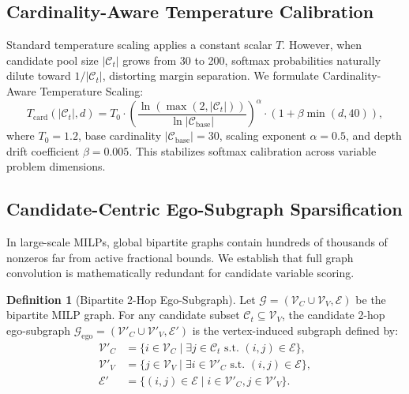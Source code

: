 \documentclass[10pt,twocolumn,letterpaper]{article}
\theoremstyle{plain}
\theoremstyle{definition}
\newtheorem{definition}{Definition}
\theoremstyle{remark}
\begin{document}
\subsection{Cardinality-Aware Temperature Calibration}
Standard temperature scaling applies a constant scalar $T$. However, when candidate pool size $|\mathcal{C}_t|$ grows from 30 to 200, softmax probabilities naturally dilute toward $1 / |\mathcal{C}_t|$, distorting margin separation. We formulate Cardinality-Aware Temperature Scaling:
\begin{equation}
    T_{\text{card}}(|\mathcal{C}_t|, d) = T_0 \cdot \left(\frac{\ln(\max(2, |\mathcal{C}_t|))}{\ln |\mathcal{C}_{\text{base}}|}\right)^\alpha \cdot \left(1 + \beta \min(d, 40)\right), \label{eq:temp_scaling}
\end{equation}
where $T_0 = 1.2$, base cardinality $|\mathcal{C}_{\text{base}}| = 30$, scaling exponent $\alpha = 0.5$, and depth drift coefficient $\beta = 0.005$. This stabilizes softmax calibration across variable problem dimensions.

\subsection{Candidate-Centric Ego-Subgraph Sparsification}
In large-scale MILPs, global bipartite graphs contain hundreds of thousands of nonzeros far from active fractional bounds. We establish that full graph convolution is mathematically redundant for candidate variable scoring.

\begin{definition}[Bipartite 2-Hop Ego-Subgraph]
Let $\mathcal{G} = (\mathcal{V}_C \cup \mathcal{V}_V, \mathcal{E})$ be the bipartite MILP graph. For any candidate subset $\mathcal{C}_t \subseteq \mathcal{V}_V$, the candidate 2-hop ego-subgraph $\mathcal{G}_{\text{ego}} = (\mathcal{V}'_C \cup \mathcal{V}'_V, \mathcal{E}')$ is the vertex-induced subgraph defined by:
\begin{align}
    \mathcal{V}'_C &= \{i \in \mathcal{V}_C \mid \exists j \in \mathcal{C}_t \text{ s.t. } (i, j) \in \mathcal{E}\}, \label{eq:ego_vc} \\
    \mathcal{V}'_V &= \{j \in \mathcal{V}_V \mid \exists i \in \mathcal{V}'_C \text{ s.t. } (i, j) \in \mathcal{E}\}, \label{eq:ego_vv} \\
    \mathcal{E}' &= \{(i, j) \in \mathcal{E} \mid i \in \mathcal{V}'_C, j \in \mathcal{V}'_V\}. \label{eq:ego_edges}
\end{align}
\end{definition}
\end{document}
